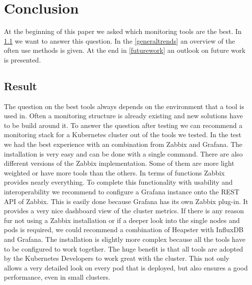 
\chapter{Conclusion}\label{chap:conclusion}
At the beginning of this paper we asked which monitoring tools are the best.
In \cref{result} we want to answer this question. In the \cref{generaltrends} an overview of the often use methods is given. At the end in \cref{futurework} an outlook on future work is presented. 
\section{Result}
\label{result}
The question on the best tools always depends on the environment that a tool is used in. Often a monitoring structure is already existing and new solutions have to be build around it.
To answer the question after testing we can recommend a monitoring stack for a Kubernetes cluster out of the tools we tested. In the test we had the best experience with an combination from Zabbix and Grafana. The installation is very easy and can be done with a single command. There are also different versions of the Zabbix implementation. Some of them are more light weighted or have more tools than the others. In terms of functions Zabbix provides nearly everything. To complete this functionality with usability and interoperability we recommend to configure a Grafana instance onto the REST API of Zabbix. This is easily done because Grafana has its own Zabbix plug-in. It provides a very nice dashboard view of the cluster metrics.
If there is any reason fur not using a Zabbix installation or if a deeper look into the single nodes and pods is required, we could recommend a combination of Heapster with InfluxDB and Grafana. The installation is slightly more complex because all the tools have to be configured to work together. The huge benefit is that all tools are adopted by the Kubernetes Developers to work great with the cluster. This not only allows a very detailed look on every pod that is deployed, but also ensures a good performance, even in small clusters. 


